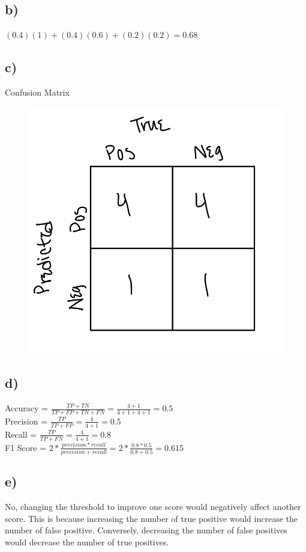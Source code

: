\documentclass[12pt, letterpaper]{article}
\begin{document}
\subsection*{b)} $(0.4)(1) + (0.4)(0.6) + (0.2)(0.2) = 0.68$

\subsection*{c)} Confusion Matrix
\FloatBarrier
\begin{figure}[h!]
  \includegraphics[scale=0.33]{./images/3c.jpg}
\end{figure}

\subsection*{d)} Accuracy = $\frac{TP + TN}{TP+FP+TN+FN} = \frac{4+1}{4+1+4+1} = 0.5$\\
Precision = $\frac{TP}{TP+FP} = \frac{4}{4+1} = 0.5$\\
Recall = $\frac{TP}{TP+FN} = \frac{4}{4+1} = 0.8$\\
F1 Score = $2 * \frac{precision * recall}{precision+recall} = 2*\frac{0.8*0.5}{0.8+0.5} = 0.615$

\subsection*{e)} No, changing the threshold to improve one score would negatively affect another score. This is because increasing the number of true positive would increase the number of false positive. Conversely, decreasing the number of false positives would decrease the number of true positives.
\end{document}
